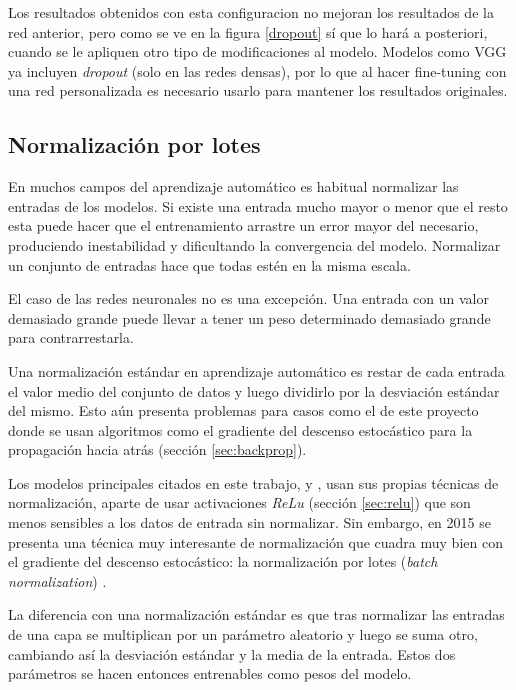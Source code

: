 Los resultados obtenidos con esta configuracion no mejoran los resultados de la red anterior, pero como se ve en la figura \ref{dropout} sí que lo hará a posteriori, cuando se le apliquen otro tipo de modificaciones al modelo. Modelos como VGG ya incluyen \textit{dropout} (solo en las redes densas), por lo que al hacer fine-tuning con una red personalizada es necesario usarlo para mantener los resultados originales.

\subsection{Normalización por lotes}

En muchos campos del aprendizaje automático es habitual normalizar las entradas
de los modelos. Si existe una entrada mucho mayor o menor que el resto esta
puede hacer que el entrenamiento arrastre un error mayor del necesario,
produciendo inestabilidad y dificultando la convergencia del modelo. Normalizar
un conjunto de entradas hace que todas estén en la misma escala. 

El caso de las redes neuronales no es una excepción. Una entrada con un valor
demasiado grande puede llevar a tener un peso determinado demasiado grande para
contrarrestarla.

Una normalización estándar en aprendizaje automático es restar de cada entrada
el valor medio del conjunto de datos y luego dividirlo por la desviación
estándar del mismo. Esto aún presenta problemas para casos como el de este
proyecto donde se usan algoritmos como el gradiente del descenso estocástico
para la propagación hacia atrás (sección \ref{sec:backprop}).

Los modelos principales citados en este trabajo,
\parencite{krizhevsky2012imagenet} y \parencite{simonyan}, usan sus propias
técnicas de normalización, aparte de usar activaciones \textit{ReLu} (sección
\ref{sec:relu}) que son menos sensibles a los datos de entrada sin normalizar.
Sin embargo, en 2015 se presenta una técnica muy interesante de normalización
que cuadra muy bien con el gradiente del descenso estocástico: la normalización
por lotes (\textit{batch normalization}) \parencite{batch_normalization}.

La diferencia con una normalización estándar es que tras normalizar las
entradas de una capa se multiplican por un parámetro aleatorio y luego se
suma otro, cambiando así la desviación estándar y la media de la entrada. Estos
dos parámetros se hacen entonces entrenables como pesos del modelo.

